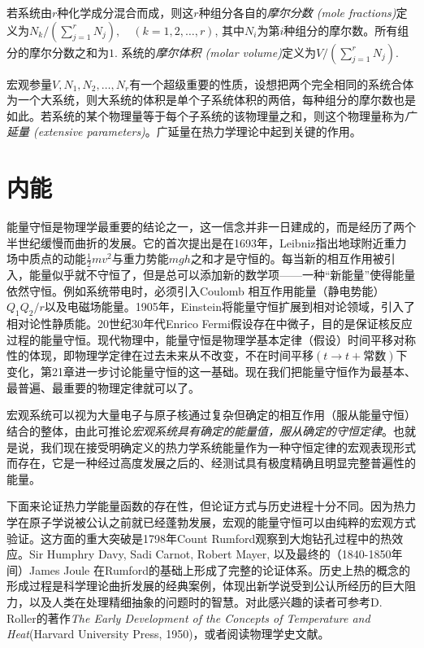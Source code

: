 若系统由$r$种化学成分混合而成，则这$r$种组分各自的{\it 摩尔分数 (mole fractions)}定义为$N_k / (\sum_{j = 1}^r N_j), \quad (k = 1, 2, \dots, r)$, 其中$N_i$为第$i$种组分的摩尔数。所有组分的摩尔分数之和为$1$. 系统的{\it 摩尔体积 (molar volume)}定义为$V / (\sum_{j = 1}^r N_j)$.

宏观参量$V, N_1, N_2, \dots, N_r$有一个超级重要的性质，设想把两个完全相同的系统合体为一个大系统，则大系统的体积是单个子系统体积的两倍，每种组分的摩尔数也是如此。若系统的某个物理量等于每个子系统的该物理量之和，则这个物理量称为{\it 广延量 (extensive parameters)}。广延量在热力学理论中起到关键的作用。

\section{内能}
\label{sec1.4}
能量守恒是物理学最重要的结论之一，这一信念并非一日建成的，而是经历了两个半世纪缓慢而曲折的发展。它的首次提出是在1693年，Leibniz指出地球附近重力场中质点的动能$\frac{1}{2} m v^2$与重力势能$mgh$之和才是守恒的。每当新的相互作用被引入，能量似乎就不守恒了，但是总可以添加新的数学项——一种“新能量”使得能量依然守恒。例如系统带电时，必须引入{Coulomb 相互作用能量}（静电势能）$Q_1 Q_2 / r$以及电磁场能量。1905年，Einstein将能量守恒扩展到相对论领域，引入了相对论性静质能。20世纪30年代Enrico Fermi假设存在中微子，目的是保证核反应过程的能量守恒。现代物理中，能量守恒是物理学基本定律（假设）时间平移对称性的体现，即物理学定律在过去未来从不改变，不在时间平移$(t \to t + \text{常数})$下变化，第21章进一步讨论能量守恒的这一基础。现在我们把能量守恒作为最基本、最普遍、最重要的物理定律就可以了。

宏观系统可以视为大量电子与原子核通过复杂但确定的相互作用（服从能量守恒）结合的整体，由此可推论{\it 宏观系统具有确定的能量值，服从确定的守恒定律}。也就是说，我们现在接受明确定义的热力学系统能量作为一种守恒定律的宏观表现形式而存在，它是一种经过高度发展之后的、经测试具有极度精确且明显完整普遍性的能量。

下面来论证热力学能量函数的存在性，但论证方式与历史进程十分不同。因为热力学在原子学说被公认之前就已经蓬勃发展，宏观的能量守恒可以由纯粹的宏观方式验证。这方面的重大突破是1798年Count Rumford观察到大炮钻孔过程中的热效应。Sir Humphry Davy, Sadi Carnot, Robert Mayer, 以及最终的（1840-1850年间）James Joule 在Rumford的基础上形成了完整的论证体系。历史上热的概念的形成过程是科学理论曲折发展的经典案例，体现出新学说受到公认所经历的巨大阻力，以及人类在处理精细抽象的问题时的智慧。对此感兴趣的读者可参考D. Roller的著作{\it The Early Development of the Concepts of Temperature and Heat}(Harvard University Press, 1950)，或者阅读物理学史文献。

